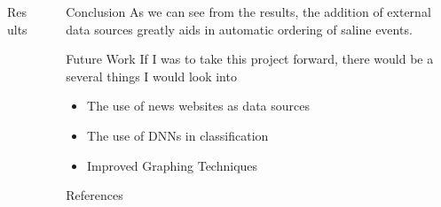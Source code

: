 \documentclass[final]{beamer}
\newlength{\sepwid}
\newlength{\onecolwid}
\newlength{\twocolwid}
\begin{document}
\begin{frame}[t]
\begin{columns}[t]
\begin{column}{\twocolwid}
\begin{columns}[t,totalwidth=\twocolwid]
\begin{column}{\onecolwid}
\begin{block}{Results}
\end{block}


\end{column} %

\end{columns} %

\end{column} %

\begin{column}{\sepwid}\end{column} %

\begin{column}{\onecolwid} %


\begin{block}{Conclusion}
  As we can see from the results, the addition of external data sources greatly aids in
  automatic ordering of saline events.

\end{block}


\begin{block}{Future Work}
If I was to take this project forward, there would be a several things I would look into
\begin{itemize}
\item The use of news websites as data sources
\item The use of DNNs in classification
\item Improved Graphing Techniques
\end{itemize}

\end{block}


\begin{block}{References}


\end{block}
\end{column}
\end{columns}
\end{frame}
\end{document}
